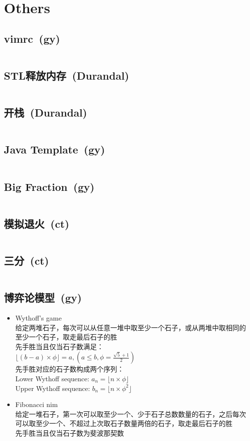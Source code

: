 \chapter{Others}
\section{vimrc\ \small(gy)}
\inputminted{vim}{Others/.vimrc}
\section{STL释放内存\ \small(Durandal)}
\inputminted{cpp}{Others/stl_clear.cpp}
\section{开栈\ \small(Durandal)}
\inputminted{cpp}{Others/rsp.cpp}
\section{Java Template\ \small(gy)}
\inputminted{java}{Others/Template.java}
\section{Big Fraction\ \small(gy)}
\inputminted{kotlin}{Others/big_fraction.kt}
\section{模拟退火\ \small(ct)}
\inputminted{cpp}{Others/simulated_annealing.cpp}
\section{三分\ \small(ct)}
\inputminted{cpp}{Others/cubic_search.cpp}
\section{博弈论模型\ \small(gy)}
\begin{itemize}
	\item Wythoff's game\\给定两堆石子，每次可以从任意一堆中取至少一个石子，或从两堆中取相同的至少一个石子，取走最后石子的胜\\先手胜当且仅当石子数满足：\\$\lfloor (b - a) \times \phi \rfloor=a, (a \leq b, \phi = \frac{\sqrt{5} + 1}{2})$\\先手胜对应的石子数构成两个序列：\\Lower Wythoff sequence: $a_n = \lfloor n \times \phi \rfloor$\\Upper Wythoff sequence: $b_n = \lfloor n \times \phi ^ 2 \rfloor$
	\item Fibonacci nim\\给定一堆石子，第一次可以取至少一个、少于石子总数数量的石子，之后每次可以取至少一个、不超过上次取石子数量两倍的石子，取走最后石子的胜\\先手胜当且仅当石子数为斐波那契数
\end{itemize}
